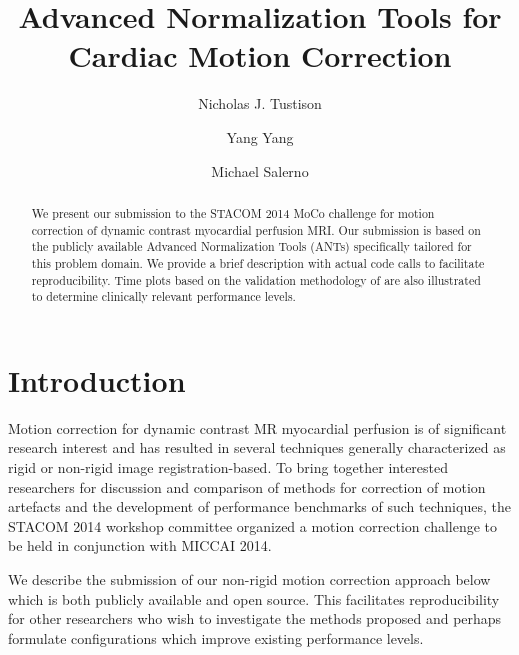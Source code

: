 \documentclass{llncs}
\begin{document}
%
\frontmatter          %
%

\mainmatter              %
%
\title{Advanced Normalization Tools for Cardiac Motion Correction}
%
\titlerunning{}  %
%
\author{Nicholas J. Tustison \and Yang Yang \and Michael Salerno}


\maketitle              %

\begin{abstract}
We present our submission to the STACOM 2014 MoCo challenge for 
motion correction of dynamic contrast myocardial perfusion
MRI.  Our submission is based on the publicly available Advanced
Normalization Tools (ANTs) specifically tailored for this problem
domain.  We provide a brief description with actual code calls
to facilitate reproducibility.  Time plots based on the
validation methodology of \cite{pack2010} are also illustrated
to determine clinically relevant performance levels.
\end{abstract}

\section{Introduction}

Motion correction for dynamic contrast MR myocardial perfusion is of significant
research interest and has resulted in several techniques generally characterized as
rigid or non-rigid image registration-based.  To bring together interested 
researchers for discussion and comparison of methods for correction of motion
artefacts and the development of performance benchmarks of such techniques, 
the STACOM 2014 workshop committee organized a motion correction challenge 
to be held in conjunction with MICCAI 2014.

We describe the submission of our non-rigid motion correction approach
below which is both publicly available and open source.  This facilitates 
reproducibility for other researchers who wish to investigate the methods
proposed and perhaps formulate configurations which improve existing
performance levels.
\end{document}
